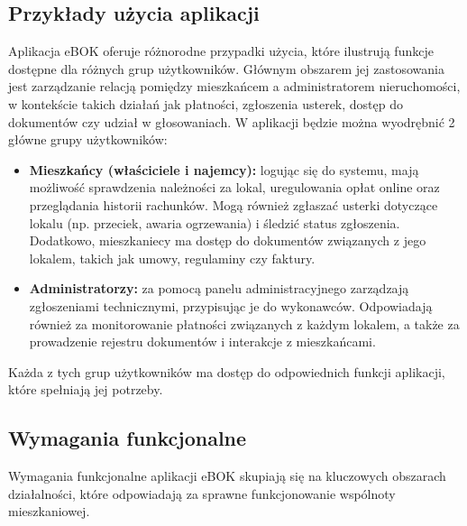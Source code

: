 \subsection{Przykłady użycia aplikacji}

Aplikacja eBOK oferuje różnorodne przypadki użycia, które ilustrują funkcje dostępne dla różnych grup użytkowników. Głównym obszarem jej zastosowania jest zarządzanie relacją pomiędzy mieszkańcem a administratorem nieruchomości, w kontekście takich działań jak płatności, zgłoszenia usterek, dostęp do dokumentów czy udział w głosowaniach. W aplikacji będzie można wyodrębnić 2 główne grupy użytkowników:

\begin{itemize} 

	\item \textbf{Mieszkańcy (właściciele i najemcy):} logując się do systemu, mają możliwość sprawdzenia należności za lokal, uregulowania opłat online oraz przeglądania historii rachunków. Mogą również zgłaszać usterki dotyczące lokalu (np. przeciek, awaria ogrzewania) i śledzić status zgłoszenia. Dodatkowo, mieszkaniecy ma dostęp do dokumentów związanych z jego lokalem, takich jak umowy, regulaminy czy faktury.
	
	\item \textbf{Administratorzy:} za pomocą panelu administracyjnego zarządzają zgłoszeniami technicznymi, przypisując je do wykonawców. Odpowiadają również za monitorowanie płatności związanych z każdym lokalem, a także za prowadzenie rejestru dokumentów i interakcje z mieszkańcami.
	
\end{itemize}

Każda z tych grup użytkowników ma dostęp do odpowiednich funkcji aplikacji, które spełniają jej potrzeby.

\subsection{Wymagania funkcjonalne}

Wymagania funkcjonalne aplikacji eBOK skupiają się na kluczowych obszarach działalności, które odpowiadają za sprawne funkcjonowanie wspólnoty mieszkaniowej.

